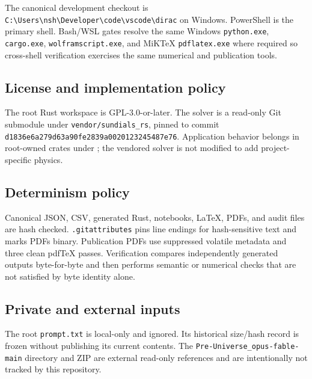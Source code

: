 \documentclass[11pt]{article}
\begin{document}
The canonical development checkout is \texttt{C:\textbackslash{}Users\allowbreak{}\textbackslash{}nsh\textbackslash{}Dev\allowbreak{}eloper\textbackslash{}c\allowbreak{}ode\textbackslash{}vsco\allowbreak{}de\textbackslash{}dirac} on Windows. PowerShell is the primary shell. Bash/WSL gates resolve the same Windows \texttt{python.e\allowbreak{}xe}, \texttt{cargo.ex\allowbreak{}e}, \texttt{wolframs\allowbreak{}cript.ex\allowbreak{}e}, and MiKTeX \texttt{pdflatex\allowbreak{}.exe} where required so cross-shell verification exercises the same numerical and publication tools.

\subsection{License and implementation policy}

The root Rust workspace is GPL-3.0-or-later. The solver is a read-only Git submodule under \texttt{vendor/s\allowbreak{}undials\_\allowbreak{}rs}, pinned to commit \texttt{d1836e6a\allowbreak{}279d63a9\allowbreak{}0fe2839a\allowbreak{}00201232\allowbreak{}45487e76}. Application behavior belongs in root-owned crates under \texttt{}; the vendored solver is not modified to add project-specific physics.

\subsection{Determinism policy}

Canonical JSON, CSV, generated Rust, notebooks, LaTeX, PDFs, and audit files are hash checked. \texttt{.gitattr\allowbreak{}ibutes} pins line endings for hash-sensitive text and marks PDFs binary. Publication PDFs use suppressed volatile metadata and three clean pdfTeX passes. Verification compares independently generated outputs byte-for-byte and then performs semantic or numerical checks that are not satisfied by byte identity alone.

\subsection{Private and external inputs}

The root \texttt{prompt.t\allowbreak{}xt} is local-only and ignored. Its historical size/hash record is frozen without publishing its current contents. The \texttt{Pre-Univ\allowbreak{}erse\_opu\allowbreak{}s-fable-\allowbreak{}main} directory and ZIP are external read-only references and are intentionally not tracked by this repository.
\end{document}
